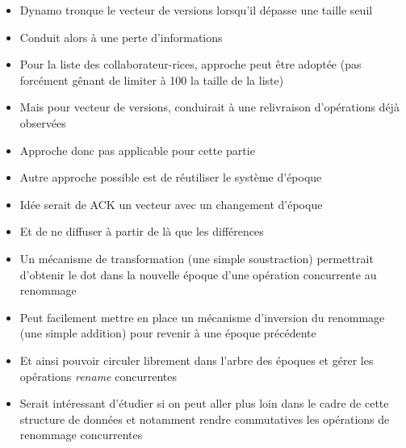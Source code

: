 \begin{itemize}
    \item Dynamo\cite{2007-dynamo} tronque le vecteur de versions lorsqu'il dépasse une taille seuil
    \item Conduit alors à une perte d'informations
    \item Pour la liste des collaborateur-rices, approche peut être adoptée (pas forcément gênant de limiter à 100 la taille de la liste)
    \item Mais pour vecteur de versions, conduirait à une relivraison d'opérations déjà observées
    \item Approche donc pas applicable pour cette partie
    \item Autre approche possible est de réutiliser le système d'époque
    \item Idée serait de ACK un vecteur avec un changement d'époque
    \item Et de ne diffuser à partir de là que les différences
    \item Un mécanisme de transformation (une simple soustraction) permettrait d'obtenir le dot dans la nouvelle époque d'une opération concurrente au renommage
    \item Peut facilement mettre en place un mécanisme d'inversion du renommage (une simple addition) pour revenir à une époque précédente
    \item Et ainsi pouvoir circuler librement dans l'arbre des époques et gérer les opérations \emph{rename} concurrentes
    \item Serait intéressant d'étudier si on peut aller plus loin dans le cadre de cette structure de données et notamment rendre commutatives les opérations de renommage concurrentes
  \end{itemize}
